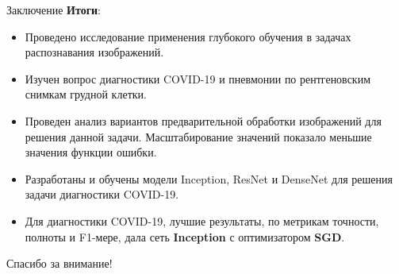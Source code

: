 \documentclass[aspectratio=169]{beamer}
\begin{document}
\begin{frame}{Заключение}
    \textbf{Итоги}:\\
    \begin{itemize}
        \item Проведено исследование применения глубокого обучения в задачах распознавания изображений.
        \item Изучен вопрос диагностики COVID-19 и пневмонии по рентгеновским снимкам грудной клетки.
        \item Проведен анализ вариантов предварительной обработки изображений для решения данной задачи. Масштабирование значений показало меньшие значения функции ошибки.
        \item Разработаны и обучены модели Inception, ResNet и DenseNet для решения задачи диагностики COVID-19.
        \item Для диагностики COVID-19, лучшие результаты, по метрикам точности, полноты и F1-мере, дала сеть \textbf{Inception} с оптимизатором \textbf{SGD}.
    \end{itemize}
\end{frame}
\begin{frame}
    \centering\Huge
    Спасибо за внимание!
\end{frame}
\end{document}
